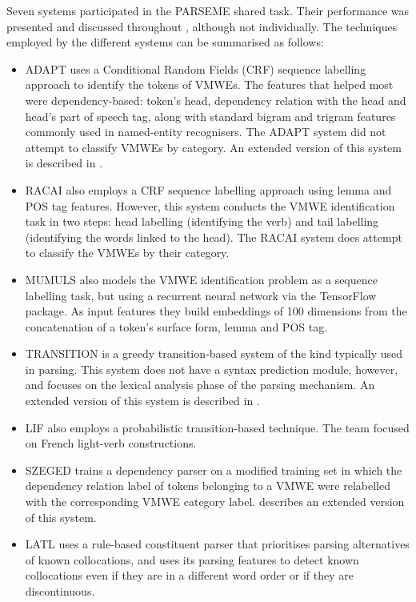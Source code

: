 \documentclass[output=paper
,modfonts
,nonflat,draftmode]{langsci/langscibook}
\begin{document}
Seven systems participated in the PARSEME shared task. Their performance was presented and discussed throughout , although not individually. The techniques employed by the different systems can be summarised as follows:

\begin{itemize}
    \item ADAPT \citep{maldonado2017} uses a Conditional Random Fields (CRF) sequence labelling approach to identify the tokens of VMWEs. The features that helped most were dependency-based: token's head, dependency relation with the head and head's part of speech tag, along with standard bigram and trigram features commonly used in named-entity recognisers. The ADAPT system did not attempt to classify VMWEs by category. An extended version of this system is described in .
    \item RACAI \citep{borocs2017} also employs a CRF sequence labelling approach using lemma and POS tag features. However, this system conducts the VMWE identification task in two steps: head labelling (identifying the verb) and tail labelling (identifying the words linked to the head). The RACAI system does attempt to classify the VMWEs by their category. 
    \item MUMULS \citep{W17-1707} also models the VMWE identification problem as a sequence labelling task, but using a recurrent neural network via the TensorFlow package. As input features they build embeddings of 100 dimensions from the concatenation of a token's surface form, lemma and POS tag. 
    \item TRANSITION \citep{W17-1717} is a greedy transition-based system of the kind typically used in parsing. This system does not have a syntax prediction module, however, and focuses on the lexical analysis phase of the parsing mechanism. An extended version of this system is described in .
    \item LIF \citep{MWEWorkshop} also employs a probabilistic transition-based technique. The team focused on French light-verb constructions. 
    \item SZEGED \citep{Simko2017} trains a dependency parser on a modified training set in which the dependency relation label of tokens belonging to a VMWE were relabelled with the corresponding VMWE category label.  describes an extended version of this system.
    \item LATL \citep{W17-1706} uses a rule-based constituent parser that prioritises parsing alternatives of known collocations, and uses its parsing features to detect known collocations even if they are in a different word order or if they are discontinuous.
\end{itemize}
\end{document}
